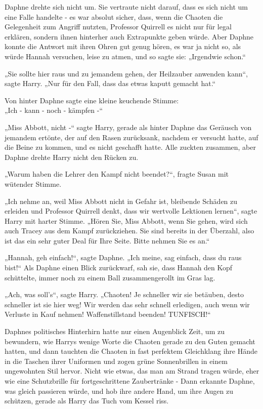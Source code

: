 {Daphne drehte sich nicht um. Sie vertraute nicht darauf, dass es sich nicht um eine Falle handelte - es war absolut sicher, dass, wenn die Chaoten die Gelegenheit zum Angriff nutzten, Professor Quirrell es nicht nur für legal erklären, sondern ihnen hinterher auch Extrapunkte geben würde. Aber Daphne konnte die Antwort mit ihren Ohren gut genug hören, es war ja nicht so, als würde Hannah versuchen, leise zu atmen, und so sagte sie: „Irgendwie schon.“

„Sie sollte hier raus und zu jemandem gehen, der Heilzauber anwenden kann“, sagte Harry. „Nur für den Fall, dass das etwas kaputt gemacht hat.“

Von hinter Daphne sagte eine kleine keuchende Stimme:\\ „Ich - kann - noch - kämpfen -“

„Miss Abbott, nicht -“ sagte Harry, gerade als hinter Daphne das Geräusch von jemandem ertönte, der auf den Rasen zurücksank, nachdem er versucht hatte, auf die Beine zu kommen, und es nicht geschafft hatte. Alle zuckten zusammen, aber Daphne drehte Harry nicht den Rücken zu.

„Warum haben die Lehrer den Kampf nicht beendet?“, fragte Susan mit wütender Stimme.

„Ich nehme an, weil Miss Abbott nicht in Gefahr ist, bleibende Schäden zu erleiden und Professor Quirrell denkt, dass wir wertvolle Lektionen lernen“, sagte Harry mit harter Stimme. „Hören Sie, Miss Abbott, wenn Sie gehen, wird sich auch Tracey aus dem Kampf zurückziehen. Sie sind bereits in der Überzahl, also ist das ein sehr guter Deal für Ihre Seite. Bitte nehmen Sie es an.“

„Hannah, geh einfach!“, sagte Daphne. „Ich meine, sag einfach, dass du raus bist!“ Als Daphne einen Blick zurückwarf, sah sie, dass Hannah den Kopf schüttelte, immer noch zu einem Ball zusammengerollt im Gras lag.

„Ach, was soll's“, sagte Harry. „Chaoten! Je schneller wir sie betäuben, desto schneller ist sie hier weg! Wir werden das sehr schnell erledigen, auch wenn wir Verluste in Kauf nehmen! Waffenstillstand beenden! TUNFISCH!“

Daphnes politisches Hinterhirn hatte nur einen Augenblick Zeit, um zu bewundern, wie Harrys wenige Worte die Chaoten gerade zu den Guten gemacht hatten, und dann tauchten die Chaoten in fast perfektem Gleichklang ihre Hände in die Taschen ihrer Uniformen und zogen grüne Sonnenbrillen in einem ungewohnten Stil hervor. Nicht wie etwas, das man am Strand tragen würde, eher wie eine Schutzbrille für fortgeschrittene Zaubertränke - Dann erkannte Daphne, was gleich passieren würde, und hob ihre andere Hand, um ihre Augen zu schützen, gerade als Harry das Tuch vom Kessel riss.

}
